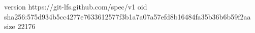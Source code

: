 version https://git-lfs.github.com/spec/v1
oid sha256:575d934b5cc4277e7633612577f3b1a7a07a57efd8b16484fa35b36b6b59f2aa
size 22176
